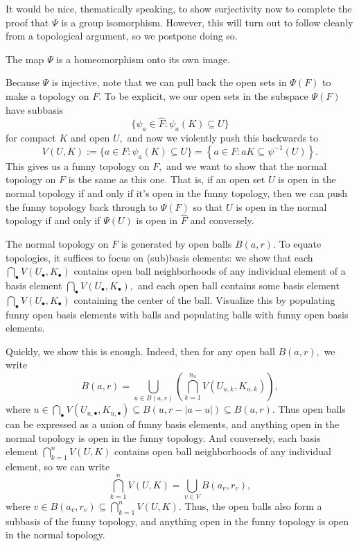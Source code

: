 It would be nice, thematically speaking, to show surjectivity now to complete the proof that $\Psi$ is a group isomorphism. However, this will turn out to follow cleanly from a topological argument, so we postpone doing so.
\begin{lemma}
    The map $\Psi$ is a homeomorphism onto its own image.
\end{lemma}
Because $\Psi$ is injective, note that we can pull back the open sets in $\Psi(F)$ to make a topology on $F.$ To be explicit, we our open sets in the subspace $\Psi(F)$ have subbasis
\[\big\{\psi_a\in\widehat F:\psi_a(K)\subseteq U\big\}\]
for compact $K$ and open $U,$ and now we violently push this backwards to
\[V(U,K):=\{a\in F:\psi_a(K)\subseteq U\}=\left\{a\in F:aK\subseteq\psi^{-1}(U)\right\}.\]
This gives us a funny topology on $F,$ and we want to show that the normal topology on $F$ is the same as this one. That is, if an open set $U$ is open in the normal topology if and only if it's open in the funny topology, then we can push the funny topology back through to $\Psi(F)$ so that $U$ is open in the normal topology if and only if $\Psi(U)$ is open in $\widehat F$ and conversely.

The normal topology on $F$ is generated by open balls $B(a,r).$ To equate topologies, it suffices to focus on (sub)basis elements: we show that each $\bigcap_\bullet V(U_\bullet,K_\bullet)$ contains open ball neighborhoods of any individual element of a basis element $\bigcap_\bullet V(U_\bullet,K_\bullet),$ and each open ball contains some basis element $\bigcap_\bullet V(U_\bullet,K_\bullet)$ containing the center of the ball. Visualize this by populating funny open basis elements with balls and populating balls with funny open basis elements.

Quickly, we show this is enough. Indeed, then for any open ball $B(a,r),$ we write
\[B(a,r)=\bigcup_{u\in B(a,r)}\left(\bigcap_{k=1}^{n_u}V(U_{u,k},K_{u,k})\right),\]
where $u\in\bigcap_\bullet V(U_{u,\bullet},K_{u,\bullet})\subseteq B(u,r-|a-u|)\subseteq B(a,r).$ Thus open balls can be expressed as a union of funny basis elements, and anything open in the normal topology is open in the funny topology. And conversely, each basis element $\bigcap_{k=1}^nV(U,K)$ contains open ball neighborhoods of any individual element, so we can write
\[\bigcap_{k=1}^nV(U,K)=\bigcup_{v\in V}B(a_v,r_v),\]
where $v\in B(a_v,r_v)\subseteq\bigcap_{k=1}^nV(U,K).$ Thus, the open balls also form a subbasis of the funny topology, and anything open in the funny topology is open in the normal topology.

